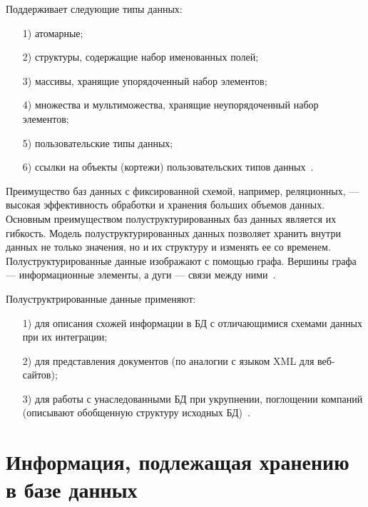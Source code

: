\documentclass{bmstu}
\begin{document}
Поддерживает следующие типы данных:
\begin{enumerate}
\item[1)] атомарные;
\item[2)] структуры, содержащие набор именованных полей;
\item[3)] массивы, хранящие упорядоченный набор элементов;
\item[4)] множества и мультиможества, хранящие неупорядоченный набор элементов;
\item[5)] пользовательские типы данных;
\item[6)] ссылки на объекты (кортежи) пользовательских типов данных~\cite{Vinogradov2016}.
\end{enumerate}

Преимущество баз данных с фиксированной схемой, например, реляционных, --- высокая эффективность обработки и хранения больших объемов данных. 
Основным преимуществом полуструктурированных баз данных является их гибкость. 
Модель полуструктурированных данных позволяет хранить внутри данных не только значения, но и их структуру и изменять ее со временем. 
Полуструктурированные данные изображают с помощью графа. 
Вершины графа --- информационные элементы, а дуги --- связи между ними~\cite{Vinogradov2016}.

Полуструктрированные данные применяют:
\begin{enumerate}
\item[1)] для описания схожей информации в БД с отличающимися схемами данных при их интеграции;
\item[2)] для представления документов (по аналогии с языком XML для веб-сайтов);
\item[3)] для работы с унаследованными БД при укрупнении, поглощении компаний (описывают обобщенную структуру исходных БД)~\cite{Vinogradov2016}.
\end{enumerate}

\section{Информация, подлежащая хранению в базе данных}
\end{document}
